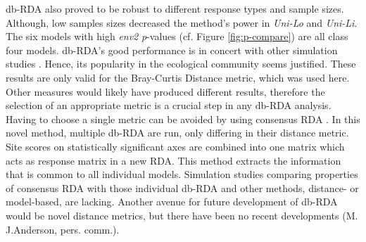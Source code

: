 
	db-RDA also proved to be robust to different response types and sample sizes. 
	Although, low samples sizes decreased the method's power in \textit{Uni-Lo} and \textit{Uni-Li}. 
	The six models with high \textit{env2} \textit{p}-values (cf. Figure \ref{fig:p-compare}) are all class four models.
	db-RDA's good performance is in concert with other simulation studies \citep[e.g.][]{Roberts2009}.
	Hence, its popularity in the ecological community seems justified. 
	These results are only valid for the Bray-Curtis Distance metric, which was used here.
	Other measures would likely have produced different results, 
	therefore the selection of an appropriate metric is a crucial step in any db-RDA analysis.
	Having to choose a single metric can be avoided by using consensus RDA \citep{Blanchet2014}.
	In this novel method, multiple db-RDA are run, only differing in their distance metric. 
	Site scores on statistically significant axes are combined into one matrix which acts as response matrix in a new RDA. 
	This method extracts the information that is common to all individual models.
	Simulation studies comparing properties of consensus RDA with those individual db-RDA and other methods, distance- or model-based, are lacking.
	Another avenue for future development of db-RDA would be novel distance metrics, but there have been no recent developments (M. J.Anderson, pers. comm.).\\


